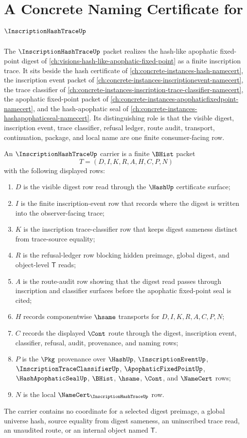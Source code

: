 \chapter{A Concrete Naming Certificate for $\InscriptionHashTraceUp$}
\label{ch:concrete-instances-inscription-hash-trace-namecert}

The $\InscriptionHashTraceUp$ packet realizes the hash-like apophatic fixed-point digest of \autoref{ch:visions-hash-like-apophatic-fixed-point} as a finite inscription trace. It sits beside the hash certificate of \autoref{ch:concrete-instances-hash-namecert}, the inscription event packet of \autoref{ch:concrete-instances-inscriptionevent-namecert}, the trace classifier of \autoref{ch:concrete-instances-inscription-trace-classifier-namecert}, the apophatic fixed-point packet of \autoref{ch:concrete-instances-apophaticfixedpoint-namecert}, and the hash-apophatic seal of \autoref{ch:concrete-instances-hashapophaticseal-namecert}. Its distinguishing role is that the visible digest, inscription event, trace classifier, refusal ledger, route audit, transport, continuation, package, and local name are one finite consumer-facing row.

\begin{definition}
\label{def:inscription-hash-trace-carrier}
An $\InscriptionHashTraceUp$ carrier is a finite $\BHist$ packet
$$
T=(D,I,K,R,A,H,C,P,N)
$$
with the following displayed rows:
\begin{enumerate}
\item $D$ is the visible digest row read through the $\HashUp$ certificate surface;
\item $I$ is the finite inscription-event row that records where the digest is written into the observer-facing trace;
\item $K$ is the inscription trace-classifier row that keeps digest sameness distinct from trace-source equality;
\item $R$ is the refusal-ledger row blocking hidden preimage, global digest, and object-level $\mathsf{T}$ reads;
\item $A$ is the route-audit row showing that the digest read passes through inscription and classifier surfaces before the apophatic fixed-point seal is cited;
\item $H$ records componentwise $\hsame$ transports for $D,I,K,R,A,C,P,N$;
\item $C$ records the displayed $\Cont$ route through the digest, inscription event, classifier, refusal, audit, provenance, and naming rows;
\item $P$ is the $\Pkg$ provenance over $\HashUp$, $\InscriptionEventUp$, $\InscriptionTraceClassifierUp$, $\ApophaticFixedPointUp$, $\HashApophaticSealUp$, $\BHist$, $\hsame$, $\Cont$, and $\NameCert$ rows;
\item $N$ is the local $\NameCert_{\InscriptionHashTraceUp}$ row.
\end{enumerate}
The carrier contains no coordinate for a selected digest preimage, a global universe hash, source equality from digest sameness, an uninscribed trace read, an unaudited route, or an internal object named $\mathsf{T}$.
\end{definition}

